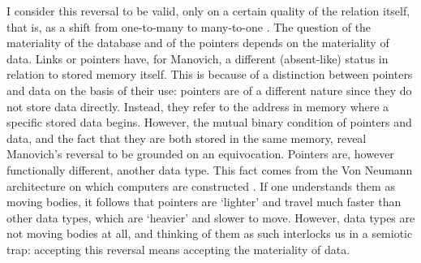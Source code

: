 I consider this reversal to be valid, only on a certain quality of the relation itself, that is, as a shift from one-to-many to many-to-one . The question of the materiality of the database and of the pointers depends on the materiality of data. Links or pointers have, for Manovich, a different (absent-like) status in relation to stored memory itself. This is because of a distinction between pointers and data on the basis of their use: pointers are of a different nature since they do not store data directly. Instead, they refer to the address in memory where a specific stored data begins. However, the mutual binary condition of pointers and data, and the fact that they are both stored in the same memory, reveal Manovich's reversal to be grounded on an equivocation. Pointers are, however functionally different, another data type. This fact comes from the Von Neumann architecture on which computers are constructed . If one understands them as moving bodies, it follows that pointers are `lighter' and travel much faster than other data types, which are `heavier' and slower to move. However, data types are not moving bodies at all, and thinking of them as such interlocks us in a semiotic trap: accepting this reversal means accepting the materiality of data.